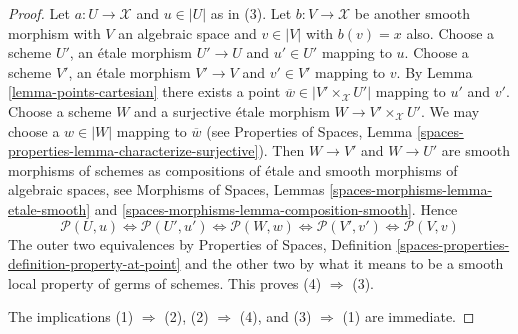 \documentclass[10pt,a4paper]{amsart}
\theoremstyle{plain}
\theoremstyle{definition}
\theoremstyle{remark}
\numberwithin{equation}{subsection}
\begin{document}
\begin{proof}
Let $a : U \to \mathcal{X}$ and $u \in |U|$ as in (3). Let
$b : V \to \mathcal{X}$ be another smooth morphism with $V$ an algebraic
space and $v \in |V|$ with $b(v) = x$ also.
Choose a scheme $U'$, an \'etale morphism $U' \to U$ and $u' \in U'$
mapping to $u$. Choose a scheme $V'$, an \'etale morphism $V' \to V$
and $v' \in V'$ mapping to $v$. By
Lemma \ref{lemma-points-cartesian}
there exists a point $\overline{w} \in |V' \times_\mathcal{X} U'|$
mapping to $u'$ and $v'$. Choose a scheme $W$ and a surjective \'etale
morphism $W \to V' \times_\mathcal{X} U'$. We may choose a
$w \in |W|$ mapping to $\overline{w}$ (see
Properties of Spaces,
Lemma \ref{spaces-properties-lemma-characterize-surjective}).
Then $W \to V'$ and $W \to U'$ are smooth morphisms of schemes
as compositions of \'etale and smooth morphisms of algebraic spaces, see
Morphisms of Spaces, Lemmas \ref{spaces-morphisms-lemma-etale-smooth} and
\ref{spaces-morphisms-lemma-composition-smooth}.
Hence
$$
\mathcal{P}(U, u)
\Leftrightarrow
\mathcal{P}(U', u')
\Leftrightarrow
\mathcal{P}(W, w)
\Leftrightarrow
\mathcal{P}(V', v')
\Leftrightarrow
\mathcal{P}(V, v)
$$
The outer two equivalences by
Properties of Spaces,
Definition \ref{spaces-properties-definition-property-at-point}
and the other two by what it means to be a smooth local property
of germs of schemes. This proves (4) $\Rightarrow$ (3).

\medskip\noindent
The implications (1) $\Rightarrow$ (2), (2) $\Rightarrow$ (4),
and (3) $\Rightarrow$ (1) are immediate.
\end{proof}
\end{document}
